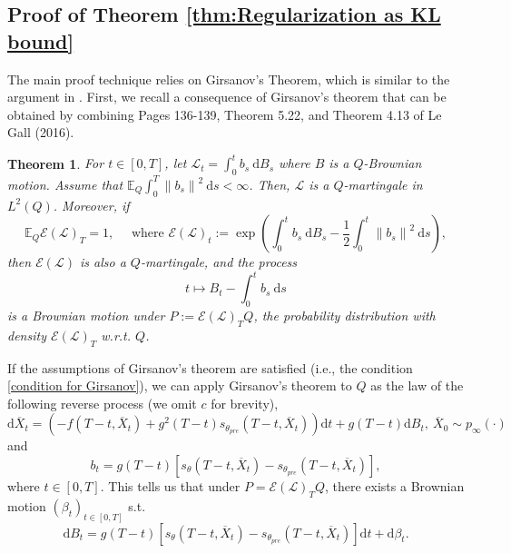 \documentclass{article}
\theoremstyle{plain}
\newtheorem{theorem}{Theorem}[section]
\theoremstyle{definition}
\theoremstyle{remark}
\begin{document}
\subsection{Proof of Theorem \ref{thm:Regularization as KL bound}}
\label{Proof of Regularization as KL bound}
The main proof technique relies on Girsanov's Theorem, which is similar to the argument in \cite{chen2022sampling}. First, we recall a consequence of Girsanov's theorem that can be obtained by combining Pages 136-139, Theorem 5.22, and Theorem 4.13 of Le Gall (2016).
\begin{theorem} For $t \in[0, T]$, let $\mathcal{L}_t=\int_0^t b_s \mathrm{~d} B_s$ where $B$ is a $Q$-Brownian motion. Assume that $\mathbb{E}_Q \int_0^T\left\|b_s\right\|^2 \mathrm{~d} s<\infty$. Then, $\mathcal{L}$ is a $Q$-martingale in $L^2(Q)$. Moreover, if
\begin{equation}
\label{condition for Girsanov}
\mathbb{E}_Q \mathcal{E}(\mathcal{L})_T=1, \quad \text { where } \mathcal{E}(\mathcal{L})_t:=\exp \left(\int_0^t b_s \mathrm{~d} B_s-\frac{1}{2} \int_0^t\left\|b_s\right\|^2 \mathrm{~d} s\right),
\end{equation}
then $\mathcal{E}(\mathcal{L})$ is also a $Q$-martingale, and the process
\begin{equation}
t \mapsto B_t-\int_0^t b_s \mathrm{~d} s
\end{equation}
is a Brownian motion under $P:=\mathcal{E}(\mathcal{L})_T Q$, the probability distribution with density $\mathcal{E}(\mathcal{L})_T$ w.r.t. $Q$.
\end{theorem}
If the assumptions of Girsanov's theorem are satisfied (i.e., the condition \eqref{condition for Girsanov}), we can apply Girsanov's theorem to $Q$ as the law of the following reverse process (we omit $c$ for brevity),
\begin{equation}
\label{eqn:ReverseSDEapprox by pretrain}
\mathrm{d} \overline{X}_t = \left(-f(T-t,\overline{X}_t) + g^2(T-t) s_{\theta_{pre}}(T-t, \overline{X}_t)  \right) \mathrm{d}t + g(T-t) \mathrm{d}B_t,\ \overline{X}_0\sim p_\infty(\cdot)
\end{equation}
and
\begin{equation}
b_t=g(T-t)\left[s_{\theta}(T-t, \overline{X}_t)-s_{\theta_{pre}}(T-t, \overline{X}_t)\right],
\end{equation}
where $t \in[0,T]$. This tells us that under $P=\mathcal{E}(\mathcal{L})_T Q$, there exists a Brownian motion $\left(\beta_t\right)_{t \in[0, T]}$ s.t.
\begin{equation}
\label{new BM under new measure}
\mathrm{d} B_t=g(T-t)\left[s_{\theta}(T-t, \overline{X}_t)-s_{\theta_{pre}}(T-t, \overline{X}_t)\right] \mathrm{d} t+\mathrm{d} \beta_t.
\end{equation}
\end{document}
